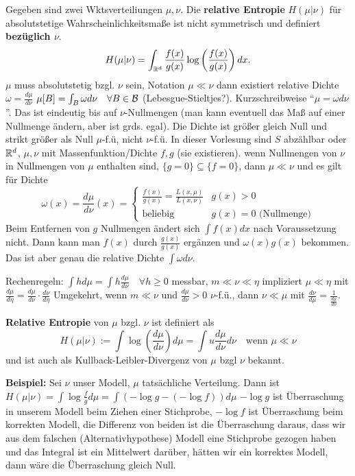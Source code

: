 \begin{outline}
\0 Gegeben sind zwei Wktsverteiliungen $\mu, \nu$. Die \textbf{relative Entropie} $H(\mu|\nu)$ für absolutstetige Wahrscheinlichkeitsmaße ist nicht symmetrisch und definiert \textbf{bezüglich $\nu$}. 
$$H(\mu|\nu) = \int_{\mathbb{R}^d}\frac{f(x)}{g(x)}\log\left(\frac{f(x)}{g(x)}\right)dx.$$
    \1 $\mu$ muss absolutstetig bzgl. $\nu$ sein,  Notation  $\mu \ll \nu$ 
    \1 dann existiert relative Dichte $\omega=\frac{d\mu}{d\nu}$
        \2 $\mu[B]=\int_B \omega d\nu \quad \forall B \in \mathcal{B}$ (Lebesgue-Stieltjes?). Kurzschreibweise \enquote{$\mu = \omega d\nu$}. Das ist eindeutig bis auf $\nu$-Nullmengen (man kann eventuell das Maß auf einer Nullmenge ändern, aber ist grds. egal). Die Dichte ist größer gleich Null und strikt größer als Null $\mu$-f.ü, nicht $\nu$-f.ü.
    \2 In dieser Vorlesung sind $S$ abzählbar oder $\mathbb{R}^d$, $\mu,\nu$ mit Massenfunktion/Dichte $f,g$ (sie existieren).
\1 wenn Nullmengen von $\nu$ in Nullmengen von $\mu$ enthalten sind, $\{g=0\}\subseteq \{f=0\}$, dann $\mu \ll \nu$ und es gilt für Dichte 
$$\omega(x)=\frac{d\mu}{d\nu}(x)=
\begin{cases}
    \frac{f(x)}{g(x)} = \frac{L(x,\mu)}{L(x,\nu)} & g(x)>0 \\
    \text{beliebig} & g(x)=0 \text{ (Nullmenge)}
\end{cases}
$$
    \1 Beim Entfernen von $g$ Nullmengen ändert sich $\int f(x)dx$ nach Voraussetzung nicht. Dann kann man $f(x)$ durch $\frac{g(x)}{g(x)}$ ergänzen und $\omega(x)g(x)$ bekommen. Das ist aber genau die relative Dichte $\int \omega d\nu$.

    \1 Rechenregeln:
        \2 $\int h d\mu = \int h \frac{d\mu}{d\nu} \quad \forall h\geq 0$ messbar,
        \2 $m \ll \nu \ll \eta$ impliziert $\mu \ll \eta$ mit $\frac{d\mu}{d\eta} = \frac{d\mu}{d\nu}\cdot \frac{d\nu}{d\eta}$
        \2 Umgekehrt, wenn $m\ll\nu$ und $\frac{d\mu}{d\nu} > 0$ $\nu$-f.ü., dann $\nu \ll \mu$ mit $\frac{d\nu}{d\mu}=\frac{1}{\frac{d\mu}{d\nu}}$.

    \1 \textbf{Relative Entropie} von $\mu$ bzgl. $\nu$ ist definiert als 
    $$H(\mu | \nu):=\int \log\left(\frac{d\mu}{d\nu}\right)d\mu = \int u \frac{d\mu}{d \nu} d\nu \quad \text{wenn } \mu\ll \nu$$
    und ist auch als Kullback-Leibler-Divergenz von $\mu$ bzgl $\nu$ bekannt.

    \1 \textbf{Beispiel:} Sei $\nu$ unser Modell, $\mu$ tatsächliche Verteilung. Dann ist $H(\mu|\nu)= \int \log \frac{f}{g}d\mu = \int (-\log g -(-\log f)) d\mu$ 
        \2 $-\log g$ ist Überraschung in unserem Modell beim Ziehen einer Stichprobe,
        \2 $-\log f$ ist Überraschung beim korrekten Modell,
        \2 die Differenz von beiden ist die Überraschung daraus, dass wir aus dem falschen (Alternativhypothese) Modell eine Stichprobe gezogen haben und das Integral ist ein Mittelwert darüber,
        \2 hätten wir ein korrektes Modell, dann wäre die Überraschung gleich Null.
        

\end{outline}

